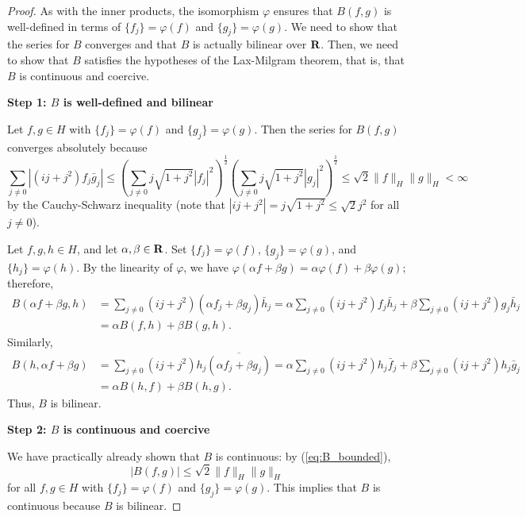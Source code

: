 \documentclass{homework}
\begin{document}
\begin{arabicparts}
		\begin{proof}
			As with the inner products, the isomorphism $\varphi$ ensures that $B(f,g)$ is well-defined in terms of $\{f_j\} = \varphi(f)$ and $\{g_j\} = \varphi(g)$. We need to show that the series for $B$ converges and that $B$ is actually bilinear over $\textbf{R}$. Then, we need to show that $B$ satisfies the hypotheses of the Lax-Milgram theorem, that is, that $B$ is continuous and coercive.
			
			\textbf{Step 1: $B$ is well-defined and bilinear}
			
			Let $f, g\in H$ with $\{f_j\} = \varphi(f)$ and $\{g_j\} = \varphi(g)$. Then the series for $B(f,g)$ converges absolutely because
			\begin{equation}
				\label{eq:B_bounded}
				\sum_{j\ne0}|(ij+j^2)f_j\bar{g}_j| \le \left(\sum_{j\ne0}j\sqrt{1+j^2}|f_j|^2\right)^\frac{1}{2}\left(\sum_{j\ne0}j\sqrt{1+j^2}|g_j|^2\right)^\frac{1}{2} \le \sqrt{2}\lVert f \rVert_H\lVert g\rVert_H < \infty
			\end{equation}
			by the Cauchy-Schwarz inequality (note that $|ij +j^2| = j\sqrt{1+j^2} \le \sqrt{2}j^2$ for all $j\ne 0$).
			
			Let $f,g,h\in H$, and let $\alpha,\beta \in \textbf{R}$. Set $\{f_j\} = \varphi(f)$, $\{g_j\} = \varphi(g)$, and $\{h_j\} = \varphi(h)$. By the linearity of $\varphi$, we have $\varphi(\alpha f + \beta g) = \alpha \varphi(f)+ \beta\varphi(g)$; therefore,
			\begin{align}
				B(\alpha f + \beta g, h) &= \sum_{j\ne0}(ij + j^2)(\alpha f_j + \beta g_j)\bar{h}_j =\alpha\sum_{j\ne 0}(ij+j^2)f_j\bar{h}_j + \beta\sum_{j\ne0}(ij+j^2)g_j\bar{h}_j \\
				&= \alpha B(f,h) + \beta B(g,h).
			\end{align}
			Similarly,
			\begin{align}
				B(h, \alpha f + \beta g) &= \sum_{j\ne0}(ij + j^2)h_j\overline{(\alpha f_j + \beta g_j)} =\alpha\sum_{j\ne 0}(ij+j^2)h_j\bar{f}_j + \beta\sum_{j\ne0}(ij+j^2)h_j\bar{g}_j \\
				&= \alpha B(h,f) + \beta B(h,g).
			\end{align}
			Thus, $B$ is bilinear.
			
			\textbf{Step 2: $B$ is continuous and coercive}
			
			We have practically already shown that $B$ is continuous: by (\ref{eq:B_bounded}),
			\begin{equation}
				|B(f,g)| \le \sqrt{2}\lVert f\rVert_H\lVert g\rVert_H
			\end{equation}
			for all $f,g\in H$ with $\{f_j\} = \varphi(f)$ and $\{g_j\} = \varphi(g)$. This implies that $B$ is continuous because $B$ is bilinear.
			

\end{proof}
\end{arabicparts}
\end{document}
